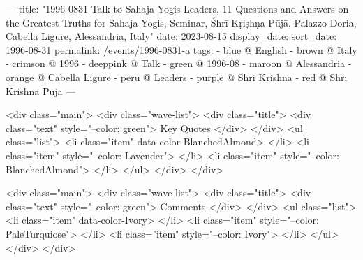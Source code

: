 ---
title: "1996-0831 Talk to Sahaja Yogis Leaders, 11 Questions and Answers on the Greatest Truths for Sahaja Yogis, Seminar, Śhrī Kṛiṣhṇa Pūjā, Palazzo Doria, Cabella Ligure, Alessandria, Italy"
date: 2023-08-15
display_date: 
sort_date: 1996-08-31
permalink: /events/1996-0831-a
tags:
  - blue @ English
  - brown @ Italy
  - crimson @ 1996
  - deeppink @ Talk
  - green @ 1996-08
  - maroon @ Alessandria
  - orange @ Cabella Ligure
  - peru @ Leaders
  - purple @ Shri Krishna
  - red @ Shri Krishna Puja
---

<div class="main">
  <div class="wave-list">
    <div class="title">
      <div class="text" style="--color: green">
        Key Quotes
      </div>
    </div>
    <ul class="list">
        <li class="item" data-color-BlanchedAlmond>
        </li>
        <li class="item" style="--color: Lavender">
        </li>
        <li class="item" style="--color: BlanchedAlmond">
        </li>
      </ul>
  </div>
</div>

<div class="main">
  <div class="wave-list">
    <div class="title">
      <div class="text" style="--color: green">
        Comments
      </div>
    </div>
    <ul class="list">
        <li class="item" data-color-Ivory>
        </li>
        <li class="item" style="--color: PaleTurquiose">
        </li>
        <li class="item" style="--color: Ivory">
        </li>
      </ul>
  </div>
</div>